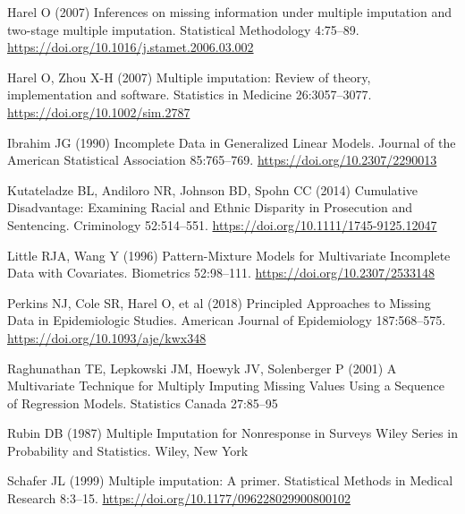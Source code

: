 \documentclass[
  letterpaper,
  DIV=11,
  numbers=noendperiod]{scrartcl}
\newlength{\cslhangindent}
\newlength{\cslentryspacingunit} %
\newenvironment{CSLReferences}[2] %
 {%
  \setlength{\parindent}{0pt}
  \ifodd #1
  \let\oldpar\par
  \def\par{\hangindent=\cslhangindent\oldpar}
  \fi
  \setlength{\parskip}{#2\cslentryspacingunit}
 }%
 {}
\begin{document}
\begin{CSLReferences}{1}{0}
\leavevmode{}%
Harel O (2007) Inferences on missing information under multiple
imputation and two-stage multiple imputation. Statistical Methodology
4:75--89. \url{https://doi.org/10.1016/j.stamet.2006.03.002}

\leavevmode{}%
Harel O, Zhou X-H (2007) Multiple imputation: Review of theory,
implementation and software. Statistics in Medicine 26:3057--3077.
\url{https://doi.org/10.1002/sim.2787}

\leavevmode{}%
Ibrahim JG (1990) Incomplete {Data} in {Generalized Linear Models}.
Journal of the American Statistical Association 85:765--769.
\url{https://doi.org/10.2307/2290013}

\leavevmode{}%
Kutateladze BL, Andiloro NR, Johnson BD, Spohn CC (2014) Cumulative
{Disadvantage}: {Examining Racial} and {Ethnic Disparity} in
{Prosecution} and {Sentencing}. Criminology 52:514--551.
\url{https://doi.org/10.1111/1745-9125.12047}

\leavevmode{}%
Little RJA, Wang Y (1996) Pattern-{Mixture Models} for {Multivariate
Incomplete Data} with {Covariates}. Biometrics 52:98--111.
\url{https://doi.org/10.2307/2533148}

\leavevmode{}%
Perkins NJ, Cole SR, Harel O, et al (2018) Principled {Approaches} to
{Missing Data} in {Epidemiologic Studies}. American Journal of
Epidemiology 187:568--575. \url{https://doi.org/10.1093/aje/kwx348}

\leavevmode{}%
Raghunathan TE, Lepkowski JM, Hoewyk JV, Solenberger P (2001) A
{Multivariate Technique} for {Multiply Imputing Missing Values Using} a
{Sequence} of {Regression Models}. Statistics Canada 27:85--95

\leavevmode{}%
Rubin DB (1987) {Multiple Imputation for Nonresponse in Surveys
\textbar{} Wiley Series in Probability and Statistics}. {Wiley}, {New
York}

\leavevmode{}%
Schafer JL (1999) Multiple imputation: A primer. Statistical Methods in
Medical Research 8:3--15.
\url{https://doi.org/10.1177/096228029900800102}


\end{CSLReferences}
\end{document}
